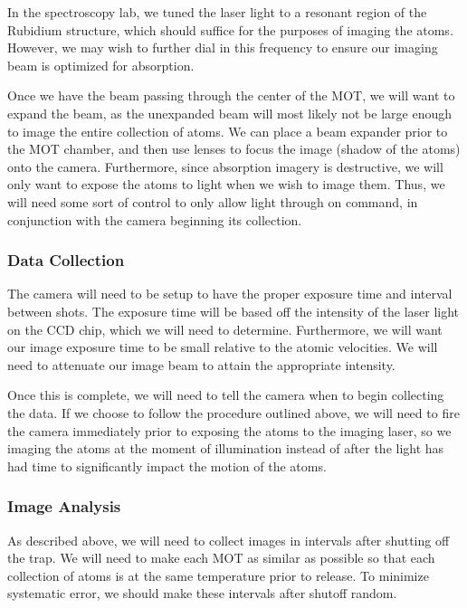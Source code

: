 \documentclass[12pt]{article}
\begin{document}
	In the spectroscopy lab, we tuned the laser light to a resonant region of the Rubidium structure, which should suffice for the purposes of imaging the atoms.  However, we may wish to further dial in this frequency to ensure our imaging beam is optimized for absorption.
	
	Once we have the beam passing through the center of the MOT, we will want to expand the beam, as the unexpanded beam will most likely not be large enough to image the entire collection of atoms.  We can place a beam expander prior to the MOT chamber, and then use lenses to focus the image (shadow of the atoms) onto the camera.  Furthermore, since absorption imagery is destructive, we will only want to expose the atoms to light when we wish to image them.  Thus, we will need some sort of control to only allow light through on command, in conjunction with the camera beginning its collection.
	
\subsubsection*{Data Collection}
	
	The camera will need to be setup to have the proper exposure time and interval between shots.  The exposure time will be based off the intensity of the laser light on the CCD chip, which we will need to determine.  Furthermore, we will want our image exposure time to be small relative to the atomic velocities.  We will need to attenuate our image beam to attain the appropriate intensity.
	
	Once this is complete, we will need to tell the camera when to begin collecting the data.  If we choose to follow the procedure outlined above, we will need to fire the camera immediately prior to exposing the atoms to the imaging laser, so we imaging the atoms at the moment of illumination instead of after the light has had time to significantly impact the motion of the atoms.
	
\subsubsection*{Image Analysis}
	
	As described above, we will need to collect images in intervals after shutting off the trap.  We will need to make each MOT as similar as possible so that each collection of atoms is at the same temperature prior to release.  To minimize systematic error, we should make these intervals after shutoff random.  
	
\end{document}
